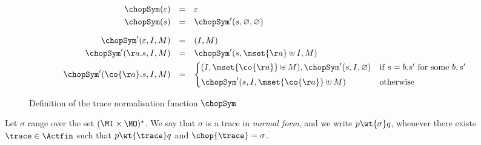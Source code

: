 \begin{figure}[t]
  \hrulefill
$$
\begin{array}{rcl}
  \chopSym(\varepsilon) & = & \varepsilon \\[3pt]
  \chopSym(s) & = & \chopSym'(s, \varnothing, \varnothing) \\[10pt]

  \chopSym'(\varepsilon, I, M) & = & (I,M) \\[3pt]
  \chopSym'(\aa.s, I, M) & = & \chopSym'(s, \mset{\aa} \uplus I, M)\\[3pt]
  \chopSym'(\co{\aa}.s, I, M) & = & %
    \begin{cases}
                                          (I, \mset{\co{\aa}} \uplus M), \chopSym'(s, I,
    \varnothing)& \text{if $s = b.s'$ for some $b, s'$} \\[3pt]
     \chopSym'(s, I,
    \mset{\co{\aa}} \uplus M)& \text{otherwise} 
\end{cases}                                
\end{array}
$$


  \caption{Definition of the trace normalisation function $\chopSym$}
  \label{fig:nf-trace-def}
  \hrulefill
\end{figure}

Let $\sigma$ range over the set $( \MI \times \MO )^\star$. We
say that $\sigma$ is a trace in {\em normal form}, and we write
$ p \wt{ \sigma } q$, whenever there exists $\trace \in \Actfin$
such that $ p \wt{ \trace } q$ and $\chop{\trace} = \sigma $.


